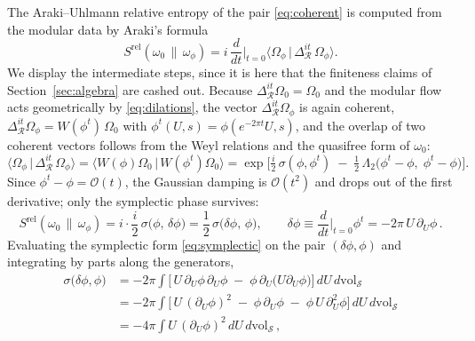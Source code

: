\documentclass[11pt]{article}
\newcommand{\Srel}{S^{\mathrm{rel}}}
\begin{document}
The Araki--Uhlmann relative entropy of the pair \eqref{eq:coherent} is computed from the modular data by Araki's formula
\begin{equation}
\Srel(\omega_0\,\|\,\omega_\phi)
= i\,\frac{d}{dt}\Big|_{t=0} \big\langle \Omega_\phi \,\big|\, \Delta_{\mathcal{R}}^{it}\, \Omega_\phi \big\rangle .
\label{eq:araki-formula}
\end{equation}
We display the intermediate steps, since it is here that the finiteness claims of Section~\ref{sec:algebra} are cashed out. Because $\Delta^{it}_{\mathcal{R}} \Omega_0 = \Omega_0$ and the modular flow acts geometrically by \eqref{eq:dilations}, the vector $\Delta_{\mathcal{R}}^{it}\Omega_\phi$ is again coherent, $\Delta_{\mathcal{R}}^{it} \Omega_\phi = W(\phi^t)\,\Omega_0$ with $\phi^t(U,s) = \phi(e^{-2\pi t} U, s)$, and the overlap of two coherent vectors follows from the Weyl relations and the quasifree form of $\omega_0$:
\begin{equation}
\big\langle \Omega_\phi \,\big|\, \Delta_{\mathcal{R}}^{it}\, \Omega_\phi \big\rangle
= \big\langle W(\phi)\Omega_0 \,\big|\, W(\phi^t)\Omega_0 \big\rangle
= \exp\!\Big[ \tfrac{i}{2}\,\sigma(\phi, \phi^t) \;-\; \tfrac{1}{2}\, \Lambda_2\big(\phi^t - \phi,\; \phi^t - \phi\big) \Big].
\label{eq:overlap}
\end{equation}
Since $\phi^t - \phi = \mathcal{O}(t)$, the Gaussian damping is $\mathcal{O}(t^2)$ and drops out of the first derivative; only the symplectic phase survives:
\begin{equation}
\Srel(\omega_0\,\|\,\omega_\phi)
= i \cdot \frac{i}{2}\,\sigma\big(\phi,\, \delta\phi\big)
= \frac{1}{2}\,\sigma\big(\delta\phi,\, \phi\big),
\qquad
\delta\phi \equiv \frac{d}{dt}\Big|_{t=0} \phi^t = -2\pi\, U\, \partial_U \phi\,.
\label{eq:Srel-symplectic}
\end{equation}
Evaluating the symplectic form \eqref{eq:symplectic} on the pair $(\delta\phi, \phi)$ and integrating by parts along the generators,
\begin{align}
\sigma\big(\delta\phi, \phi\big)
&= -2\pi \int \Big[\, U\,\partial_U\phi \,\partial_U \phi \;-\; \phi\, \partial_U\big(U \partial_U \phi\big) \Big]\, dU\, d\mathrm{vol}_{\mathcal{S}}
\nonumber\\[2pt]
&= -2\pi \int \Big[\, U\,(\partial_U\phi)^2 \;-\; \phi\,\partial_U\phi \;-\; \phi\, U\, \partial_U^2 \phi \Big]\, dU\, d\mathrm{vol}_{\mathcal{S}}
\nonumber\\[2pt]
&= -4\pi \int U\,(\partial_U\phi)^2 \, dU\, d\mathrm{vol}_{\mathcal{S}}\,,
\label{eq:byparts}
\end{align}
\end{document}
